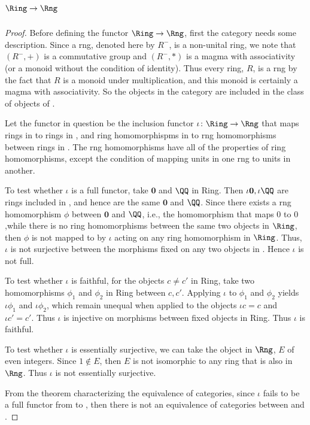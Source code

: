 \documentclass[../../main]{subfiles}
\begin{document}
\subparagraph{\(\Ring\to\Rng\)}
\begin{proof}
	Before defining the functor $\Ring\rightarrow \Rng$, first the category \Rng 
	needs some description. Since a rng, denoted here by $R^-$, is a non-unital 
	ring, we note that $(R^-,+)$ is a commutative group and $(R^-,*)$ is a magma 
	with associativity (or a monoid without the condition of identity). Thus every 
	ring, $R$, is a rng by the fact that $R$ is a monoid under multiplication, and 
	this monoid is certainly a magma with associativity. So the objects in the 
	category \Ring are included in the class of objects of \Rng. 

	Let the functor in question be the inclusion functor $\iota\colon \Ring\rightarrow \Rng$ that maps rings in \Ring to rings in \Rng, and ring homomorphispms in \Ring to rng homomorphisms between rings in \Rng. The rng homomorphisms have all of the properties of ring homomorphisms, except the condition of mapping units in one rng to units in another. 

	To test whether $\iota$ is a full functor, take $\mathbf{0}$ and  $\QQ$ in 
	Ring. Then $\iota \mathbf{0}, \iota \QQ$ are rings included in \Rng, and hence 
	are the same $\mathbf{0}$ and  $\QQ$. Since there exists a rng homomorphism 
	$\phi$ between $\mathbf{0}$ and $\QQ$, i.e., the homomorphism that maps $0$ to 
	$0$,while there is no ring homomorphisms between the same two objects in $\Ring$, then $\phi$ is not mapped to by $\iota$ acting on any ring 
	homomorphism in $\Ring$.  Thus, $\iota$ is not surjective between the 
	morphisms fixed on any two objects in \Ring. Hence $\iota$ is not full.

	To test whether $\iota$ is faithful, for the objects $c \not= c'$ in Ring, take 
	two homomorphisms $\phi_1$ and $\phi_2$ in Ring between $c, c'$. Applying 
	$\iota$ to $\phi_1$ and $\phi_2$ yields $\iota \phi_1$ and $\iota \phi_2$, 
	which remain unequal when applied to the objects $\iota c = c$ and $\iota c' = 
	c'$. Thus $\iota$ is injective on morphisms between fixed objects in Ring. Thus 
	$\iota$ is faithful.

	To test whether $\iota$ is essentially surjective, we can take the object in 
	$\Rng$, $E$ of even integers. Since $1 \notin E$, then $E$ is not 
	isomorphic to any ring that is also in $\Rng$. Thus $\iota$ is not 
	essentially surjective.

	From the theorem characterizing the equivalence of categories, since $\iota$ fails to be a full functor from \Ring to \Rng, then there is not an equivalence of categories between \Ring and \Rng. 


\end{proof}	
\end{document}
